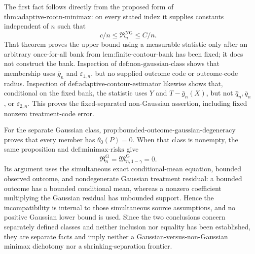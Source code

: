The first fact follows directly from the proposed form of \(\text{thm:adaptive-rootn-minimax}\): on every stated index it supplies constants independent of \(n\) such that
\[
 c/n\le\mathfrak R_n^{\mathrm{NG}}\le C/n.
\]
That theorem proves the upper bound using a measurable statistic only after an arbitrary once-for-all bank from \(\text{lem:finite-contour-bank}\) has been fixed; it does not construct the bank.  Inspection of \(\text{def:non-gaussian-class}\) shows that membership uses \(\bar g_n\) and \(\varepsilon_{1,n}\), but no supplied outcome code or outcome-code radius.  Inspection of \(\text{def:adaptive-contour-estimator}\) likewise shows that, conditional on the fixed bank, the statistic uses \(Y\) and \(T-\bar g_n(X)\), but not \(\widehat q_n,\bar q_n\), or \(\varepsilon_{2,n}\).  This proves the fixed-separated non-Gaussian assertion, including fixed nonzero treatment-code error.

For the separate Gaussian class, \(\text{prop:bounded-outcome-gaussian-degeneracy}\) proves that every member has \(\theta_0(P)=0\).  When that class is nonempty, the same proposition and \(\text{def:minimax-risks}\) give
\[
 \mathfrak R_n^{\mathrm G}=\mathfrak M_{n,1-\gamma}^{\mathrm G}=0.
\]
Its argument uses the simultaneous exact conditional-mean equation, bounded observed outcome, and nondegenerate Gaussian treatment residual: a bounded outcome has a bounded conditional mean, whereas a nonzero coefficient multiplying the Gaussian residual has unbounded support.  Hence the incompatibility is internal to those simultaneous source assumptions, and no positive Gaussian lower bound is used.  Since the two conclusions concern separately defined classes and neither inclusion nor equality has been established, they are separate facts and imply neither a Gaussian-versus-non-Gaussian minimax dichotomy nor a shrinking-separation frontier.